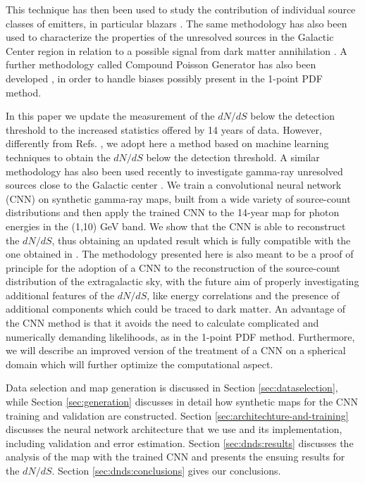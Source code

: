 This technique has then been used to study the contribution of individual source classes of emitters, in particular blazars \cite{Korsmeier:2022cwp,Manconi:2019ynl,DiMauro:2017ing,Zechlin:2017uzo}.
The same methodology has also been used to characterize the properties of the unresolved sources in the Galactic Center region in relation to a possible signal from dark matter annihilation \cite{Mishra-Sharma:2016gis,Bariuan:2022phe,Lee:2014mza,Lee:2015fea,Linden:2016rcf,Leane:2019xiy,Chang:2019ars,Buschmann:2020adf,Leane:2020nmi,Leane:2020pfc}.
{  A further methodology called Compound Poisson Generator has also been developed \cite{Collin:2021ufc}, in order to handle biases possibly present in the 1-point PDF method.}


In this paper we update the measurement of the $dN/dS$ below the detection threshold to the increased statistics offered by 14 years of \fermi data. However, differently from Refs. \cite{Cuoco-1pdf,Zechlin:2016pme}, we adopt here a method based on machine learning techniques to obtain the $dN/dS$ below the detection threshold. 
A similar methodology has also been used recently to investigate gamma-ray unresolved sources close to the Galactic center \cite{Mishra-Sharma:2021oxe,List:2021aer,List:2020mzd}.  
We train a convolutional neural network (CNN) on synthetic gamma-ray maps, built from a wide variety of source-count distributions and then apply the trained CNN to the  14-year \fermi map for photon energies in the (1,10) GeV band. We show that the CNN is able to reconstruct the $dN/dS$, thus obtaining an updated result which is fully compatible with the one obtained in \cite{Cuoco-1pdf}. The methodology presented here is also meant to be a proof of principle for the adoption of a CNN to the reconstruction of the source-count distribution of the extragalactic sky, with the future aim of properly investigating additional features of the $dN/dS$, like energy correlations and the presence of additional components which could be traced to dark matter.
{  An advantage of the CNN method is that it
avoids the need to calculate complicated and numerically demanding likelihoods, as in the 1-point PDF method.
Furthermore, we will describe an improved version of the treatment of a CNN on a spherical domain which will further optimize the computational aspect.}


Data selection and \fermi map generation is discussed in Section \ref{sec:dataselection}, while Section \ref{sec:generation} discusses in detail how synthetic maps for the CNN training and validation are constructed. Section \ref{sec:architechture-and-training} discusses the neural network architecture that we use and its implementation, including validation and error estimation. Section \ref{sec:dnds:results} discusses the analysis of the \fermi map with the trained CNN and presents the ensuing results for the $dN/dS$. Section \ref{sec:dnds:conclusions} gives our conclusions.





